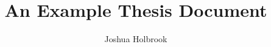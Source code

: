 \documentclass{../uafthesis}
\begin{document}
\title{An Example Thesis Document}
\author{Joshua Holbrook}

\committeewidth{4in}
\approvedwidth{4in}
\comitteespace{\hfill}
\approvedspace{\hfill}



\makesig
\maketitle

\begin{abstract}
  
\end{abstract}


\tableofcontents
\listoffigures
\listoftables
\listofappendices

\begin{acknowledgements}
  
\end{acknowledgements}

\begin{quotepage}
  
\end{quotepage}




\nocite{wikibook}



\appendix

\end{document}
